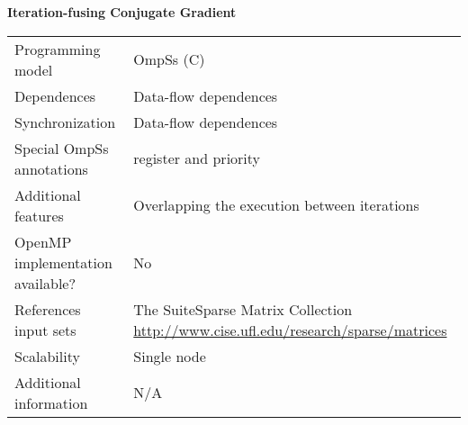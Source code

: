 \section*{}
\label{ifcg}
\centering
\Huge
\textbf{Iteration-fusing Conjugate Gradient}

\begin{table}[h!]
  \large
  \centering
  \begin{tabular}{|l|l|}
    \hline
    Programming model                & OmpSs (C) \\
    Dependences                      & Data-flow dependences \\
    Synchronization                  & Data-flow dependences \\
    Special OmpSs annotations        & register and priority \\
    Additional features              & Overlapping the execution between iterations \\
    OpenMP implementation available? & No\\
    References input sets            & The SuiteSparse Matrix Collection \url{http://www.cise.ufl.edu/research/sparse/matrices}\\
    Scalability                      & Single node \\
    Additional information           & N/A \\
    \hline
  \end{tabular}
\end{table}

\newpage

